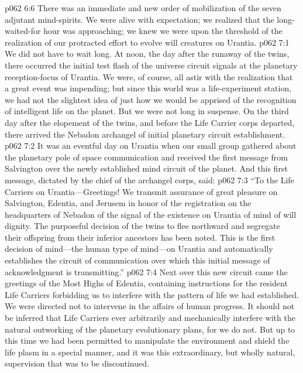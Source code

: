 \vs p062 6:6 There was an immediate and new order of mobilization of the seven adjutant mind\hyp{}spirits. We were alive with expectation; we realized that the long\hyp{}waited\hyp{}for hour was approaching; we knew we were upon the threshold of the realization of our protracted effort to evolve will creatures on Urantia.
\vs p062 7:1 We did not have to wait long. At noon, the day after the runaway of the twins, there occurred the initial test flash of the universe circuit signals at the planetary reception\hyp{}focus of Urantia. We were, of course, all astir with the realization that a great event was impending; but since this world was a life\hyp{}experiment station, we had not the slightest idea of just how we would be apprised of the recognition of intelligent life on the planet. But we were not long in suspense. On the third day after the elopement of the twins, and before the Life Carrier corps departed, there arrived the Nebadon archangel of initial planetary circuit establishment.
\vs p062 7:2 It was an eventful day on Urantia when our small group gathered about the planetary pole of space communication and received the first message from Salvington over the newly established mind circuit of the planet. And this first message, dictated by the chief of the archangel corps, said:
\vs p062 7:3 “To the Life Carriers on Urantia---Greetings! We transmit assurance of great pleasure on Salvington, Edentia, and Jerusem in honor of the registration on the headquarters of Nebadon of the signal of the existence on Urantia of mind of will dignity. The purposeful decision of the twins to flee northward and segregate their offspring from their inferior ancestors has been noted. This is the first decision of mind---the human type of mind---on Urantia and automatically establishes the circuit of communication over which this initial message of acknowledgment is transmitting.”\plusone
\vs p062 7:4 Next over this new circuit came the greetings of the Most Highs of Edentia, containing instructions for the resident Life Carriers forbidding us to interfere with the pattern of life we had established. We were directed not to intervene in the affairs of human progress. It should not be inferred that Life Carriers ever arbitrarily and mechanically interfere with the natural outworking of the planetary evolutionary plans, for we do not. But up to this time we had been permitted to manipulate the environment and shield the life plasm in a special manner, and it was this extraordinary, but wholly natural, supervision that was to be discontinued.
